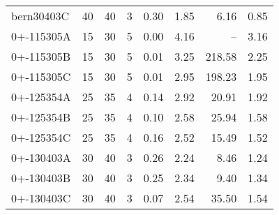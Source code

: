 \begin{scriptsize}
\begin{xtabular*}{\linewidth}{@{\extracolsep{\fill}}lrrrrrrr@{}}
bern30403C & \num{40} & \num{40} & \num{3} & \num{0.30} & \num{1.85} & \num{6.16} & \num{0.85} \\ 
0+-115305A & \num{15} & \num{30} & \num{5} & \num{0.00} & \num{4.16} & -- & \num{3.16} \\ 
0+-115305B & \num{15} & \num{30} & \num{5} & \num{0.01} & \num{3.25} & \num{218.58} & \num{2.25} \\ 
0+-115305C & \num{15} & \num{30} & \num{5} & \num{0.01} & \num{2.95} & \num{198.23} & \num{1.95} \\ 
0+-125354A & \num{25} & \num{35} & \num{4} & \num{0.14} & \num{2.92} & \num{20.91} & \num{1.92} \\ 
0+-125354B & \num{25} & \num{35} & \num{4} & \num{0.10} & \num{2.58} & \num{25.94} & \num{1.58} \\ 
0+-125354C & \num{25} & \num{35} & \num{4} & \num{0.16} & \num{2.52} & \num{15.49} & \num{1.52} \\ 
0+-130403A & \num{30} & \num{40} & \num{3} & \num{0.26} & \num{2.24} & \num{8.46} & \num{1.24} \\ 
0+-130403B & \num{30} & \num{40} & \num{3} & \num{0.25} & \num{2.34} & \num{9.40} & \num{1.34} \\ 
0+-130403C & \num{30} & \num{40} & \num{3} & \num{0.07} & \num{2.54} & \num{35.50} & \num{1.54} \\ 
\end{xtabular*} 
 \end{scriptsize} 